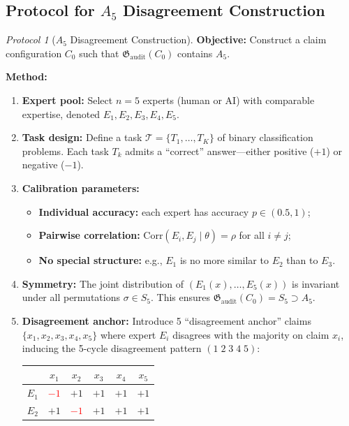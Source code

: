 \documentclass[12pt,a4paper]{article}
\theoremstyle{remark}
\newtheorem{protocol}[theorem]{Protocol}
\newcommand{\AuditGrp}{\mathfrak{G}_{\mathrm{audit}}}
\newcommand{\Corr}{\mathrm{Corr}}
\begin{document}
\subsection{Protocol for \(A_5\) Disagreement Construction}
\begin{protocol}[\(A_5\) Disagreement Construction]\label{prot:a5_construction}
\textbf{Objective:} Construct a claim configuration \(C_0\) such that \(\AuditGrp(C_0)\) contains \(A_5\).

\textbf{Method:}
\begin{enumerate}[label=\textbf{Step \arabic*}:,itemsep=5pt,leftmargin=*]
    \item \textbf{Expert pool:} Select \(n=5\) experts (human or AI) with comparable expertise, denoted \(E_1, E_2, E_3, E_4, E_5\).
    \item \textbf{Task design:} Define a task \(\mathcal{T} = \{T_1,\ldots,T_K\}\) of binary classification problems. Each task \(T_k\) admits a ``correct'' answer---either positive (\(+1\)) or negative (\(-1\)).
    \item \textbf{Calibration parameters:}
    \begin{itemize}
        \item \textbf{Individual accuracy:} each expert has accuracy \(p \in (0.5, 1)\);
        \item \textbf{Pairwise correlation:} \(\Corr(E_i, E_j \mid \theta) = \rho\) for all \(i \neq j\);
        \item \textbf{No special structure:} e.g., \(E_1\) is no more similar to \(E_2\) than to \(E_3\).
    \end{itemize}
    \item \textbf{Symmetry:} The joint distribution of \((E_1(x), \ldots, E_5(x))\) is invariant under all permutations \(\sigma \in S_5\). This ensures \(\AuditGrp(C_0) = S_5 \supset A_5\).
    \item \textbf{Disagreement anchor:} Introduce 5 ``disagreement anchor'' claims \(\{x_1, x_2, x_3, x_4, x_5\}\) where expert \(E_i\) disagrees with the majority on claim \(x_i\), inducing the 5-cycle disagreement pattern \((1\;2\;3\;4\;5)\):
    \begin{center}
    \begin{tabular}{c|ccccc}
        \toprule
         & \(x_1\) & \(x_2\) & \(x_3\) & \(x_4\) & \(x_5\) \\
        \midrule
        \(E_1\) & \textcolor{red}{\(-1\)} & \(+1\) & \(+1\) & \(+1\) & \(+1\) \\
        \(E_2\) & \(+1\) & \textcolor{red}{\(-1\)} & \(+1\) & \(+1\) & \(+1\) \\

\end{tabular}
\end{center}
\end{enumerate}
\end{protocol}
\end{document}

